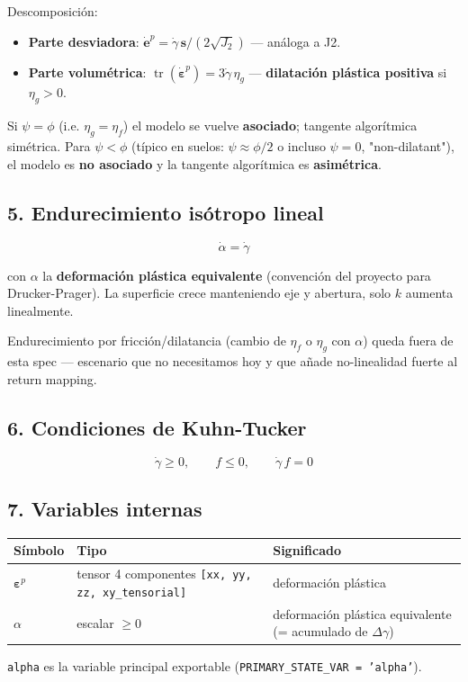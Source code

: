 \documentclass[11pt,letterpaper,oneside]{report}
\begin{document}
Descomposición:
\begin{itemize}
  \item \textbf{Parte desviadora}: $\dot{\mathbf e}^p = \dot\gamma\,\mathbf s/(2\sqrt{J_2})$ --- análoga a J2.
  \item \textbf{Parte volumétrica}: $\operatorname{tr}(\dot{\boldsymbol\varepsilon}^p) = 3\dot\gamma\,\eta_g$ --- \textbf{dilatación plástica positiva} si $\eta_g > 0$.
\end{itemize}

Si $\psi = \phi$ (i.e. $\eta_g = \eta_f$) el modelo se vuelve \textbf{asociado}; tangente algorítmica simétrica. Para $\psi < \phi$ (típico en suelos: $\psi \approx \phi/2$ o incluso $\psi = 0$, "non-dilatant"), el modelo es \textbf{no asociado} y la tangente algorítmica es \textbf{asimétrica}.

\subsection{5. Endurecimiento isótropo lineal}

\[
\dot\alpha = \dot\gamma
\]

con $\alpha$ la \textbf{deformación plástica equivalente} (convención del proyecto para Drucker-Prager). La superficie crece manteniendo eje y abertura, solo $k$ aumenta linealmente.

Endurecimiento por fricción/dilatancia (cambio de $\eta_f$ o $\eta_g$ con $\alpha$) queda fuera de esta spec --- escenario que no necesitamos hoy y que añade no-linealidad fuerte al return mapping.

\subsection{6. Condiciones de Kuhn-Tucker}

\[
\dot\gamma \geq 0,\qquad f \leq 0,\qquad \dot\gamma\,f = 0
\]

\subsection{7. Variables internas}

\begin{center}
\begin{tabularx}{\textwidth}{YYY}
\hline
\textbf{Símbolo} & \textbf{Tipo} & \textbf{Significado} \\
\hline
$\boldsymbol\varepsilon^p$ & tensor 4 componentes \texttt{[xx, yy, zz, xy\_tensorial]} & deformación plástica \\
$\alpha$ & escalar $\geq 0$ & deformación plástica equivalente (= acumulado de $\Delta\gamma$) \\
\hline
\end{tabularx}
\end{center}
\texttt{alpha} es la variable principal exportable (\texttt{PRIMARY\_STATE\_VAR = 'alpha'}).
\end{document}
